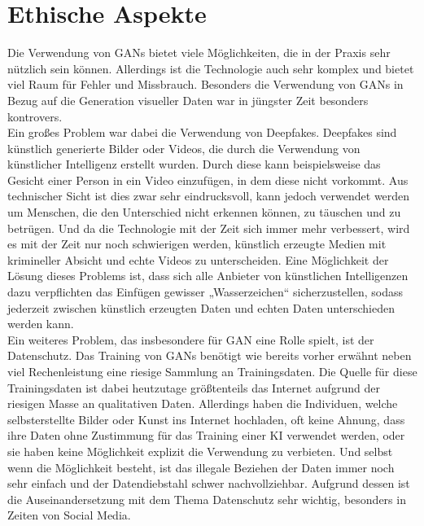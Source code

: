 \section{Ethische Aspekte}

\noindent Die Verwendung von \acp{GAN} bietet viele Möglichkeiten, die in der Praxis sehr nützlich sein können. Allerdings ist die Technologie auch sehr komplex und bietet viel Raum für Fehler und Missbrauch. Besonders die Verwendung von \acp{GAN} in Bezug auf die Generation visueller Daten war in jüngster Zeit besonders kontrovers. \\

\noindent Ein großes Problem war dabei die Verwendung von Deepfakes. Deepfakes sind künstlich generierte Bilder oder Videos, die durch die Verwendung von künstlicher Intelligenz erstellt wurden. Durch diese kann beispielsweise das Gesicht einer Person in ein Video einzufügen, in dem diese nicht vorkommt. Aus technischer Sicht ist dies zwar sehr eindrucksvoll, kann jedoch verwendet werden um Menschen, die den Unterschied nicht erkennen können, zu täuschen und zu betrügen. Und da die Technologie mit der Zeit sich immer mehr verbessert, wird es mit der Zeit nur noch schwierigen werden, künstlich erzeugte Medien mit krimineller Absicht und echte Videos zu unterscheiden. Eine Möglichkeit der Lösung dieses Problems ist, dass sich alle Anbieter von künstlichen Intelligenzen dazu verpflichten das Einfügen gewisser „Wasserzeichen“ sicherzustellen, sodass jederzeit zwischen künstlich erzeugten Daten und echten Daten unterschieden werden kann.\\

\noindent Ein weiteres Problem, das insbesondere für \ac{GAN} eine Rolle spielt, ist der Datenschutz. Das Training von \acp{GAN} benötigt wie bereits vorher erwähnt neben viel Rechenleistung eine riesige Sammlung an Trainingsdaten. Die Quelle für diese Trainingsdaten ist dabei heutzutage größtenteils das Internet aufgrund der riesigen Masse an qualitativen Daten. Allerdings haben die Individuen, welche selbsterstellte Bilder oder Kunst ins Internet hochladen, oft keine Ahnung, dass ihre Daten ohne Zustimmung für das Training einer KI verwendet werden, oder sie haben keine Möglichkeit explizit die Verwendung zu verbieten. Und selbst wenn die Möglichkeit besteht, ist das illegale Beziehen der Daten immer noch sehr einfach und der Datendiebstahl schwer nachvollziehbar. Aufgrund dessen ist die Auseinandersetzung mit dem Thema Datenschutz sehr wichtig, besonders in Zeiten von Social Media. \\

\newpage